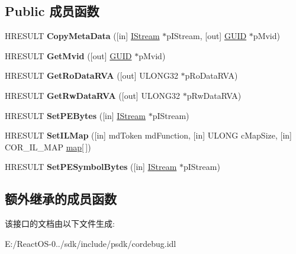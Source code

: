 \subsection*{Public 成员函数}
\begin{DoxyCompactItemize}
\item 
\mbox{\label{interface_i_cor_debug_edit_and_continue_snapshot_a7c3a59d4bbc9f516ef47f1ebb2f8ba87}} 
H\+R\+E\+S\+U\+LT {\bfseries Copy\+Meta\+Data} (\mbox{[}in\mbox{]} \hyperlink{interface_i_stream}{I\+Stream} $\ast$p\+I\+Stream, \mbox{[}out\mbox{]} \hyperlink{interface_g_u_i_d}{G\+U\+ID} $\ast$p\+Mvid)
\item 
\mbox{\label{interface_i_cor_debug_edit_and_continue_snapshot_ae536d8331494543da189f1c7f4532d40}} 
H\+R\+E\+S\+U\+LT {\bfseries Get\+Mvid} (\mbox{[}out\mbox{]} \hyperlink{interface_g_u_i_d}{G\+U\+ID} $\ast$p\+Mvid)
\item 
\mbox{\label{interface_i_cor_debug_edit_and_continue_snapshot_ae1551a6f8300826af14eef9ba2a0085e}} 
H\+R\+E\+S\+U\+LT {\bfseries Get\+Ro\+Data\+R\+VA} (\mbox{[}out\mbox{]} U\+L\+O\+N\+G32 $\ast$p\+Ro\+Data\+R\+VA)
\item 
\mbox{\label{interface_i_cor_debug_edit_and_continue_snapshot_a4f3b3ed991dce28fe2c532066fa6ea05}} 
H\+R\+E\+S\+U\+LT {\bfseries Get\+Rw\+Data\+R\+VA} (\mbox{[}out\mbox{]} U\+L\+O\+N\+G32 $\ast$p\+Rw\+Data\+R\+VA)
\item 
\mbox{\label{interface_i_cor_debug_edit_and_continue_snapshot_a23ed5301cdcd4d9bcc6d5fbbdd7b5328}} 
H\+R\+E\+S\+U\+LT {\bfseries Set\+P\+E\+Bytes} (\mbox{[}in\mbox{]} \hyperlink{interface_i_stream}{I\+Stream} $\ast$p\+I\+Stream)
\item 
\mbox{\label{interface_i_cor_debug_edit_and_continue_snapshot_adb3889c562fa5a43ef26312eee34af3e}} 
H\+R\+E\+S\+U\+LT {\bfseries Set\+I\+L\+Map} (\mbox{[}in\mbox{]} md\+Token md\+Function, \mbox{[}in\mbox{]} U\+L\+O\+NG c\+Map\+Size, \mbox{[}in\mbox{]} C\+O\+R\+\_\+\+I\+L\+\_\+\+M\+AP \hyperlink{classmap}{map}\mbox{[}$\,$\mbox{]})
\item 
\mbox{\label{interface_i_cor_debug_edit_and_continue_snapshot_a7dcdfdd8d7b248461ce0d7226c67ba39}} 
H\+R\+E\+S\+U\+LT {\bfseries Set\+P\+E\+Symbol\+Bytes} (\mbox{[}in\mbox{]} \hyperlink{interface_i_stream}{I\+Stream} $\ast$p\+I\+Stream)
\end{DoxyCompactItemize}
\subsection*{额外继承的成员函数}


该接口的文档由以下文件生成\+:\begin{DoxyCompactItemize}
\item 
E\+:/\+React\+O\+S-\/0../sdk/include/psdk/cordebug.\+idl\end{DoxyCompactItemize}
